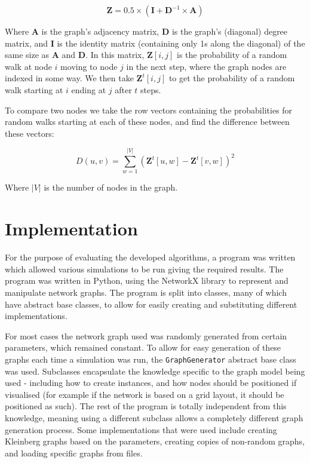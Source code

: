 \documentclass[bsc,frontabs,twoside,singlespacing,parskip,deptreport]{infthesis}     %
\begin{document}
\begin{equation}
\textbf{Z} = 0.5 \times (\textbf{I} + \textbf{D}^{-1} \times \textbf{A})
\end{equation}

Where $\textbf{A}$ is the graph's adjacency matrix, $\textbf{D}$ is the graph's (diagonal) degree matrix, and $\textbf{I}$ is the identity matrix (containing only 1s along the diagonal) of the same size as $\textbf{A}$ and $\textbf{D}$. In this matrix, $\textbf{Z}[i, j]$ is the probability of a random walk at node $i$ moving to node $j$ in the next step, where the graph nodes are indexed in some way. We then take $\textbf{Z}^{t}[i, j]$ to get the probability of a random walk starting at $i$ ending at $j$ after $t$ steps.

To compare two nodes we take the row vectors containing the probabilities for random walks starting at each of these nodes, and find the difference between these vectors:

\begin{equation}
D(u, v) = \sum_{w=1}^{|V|} (\textbf{Z}^{t}[u, w] - \textbf{Z}^{t}[v, w])^{2}
\end{equation}

Where $|V|$ is the number of nodes in the graph.

\chapter{Implementation} \label{chapter3}
For the purpose of evaluating the developed algorithms, a program was written which allowed various simulations to be run giving the required results. The program was written in Python, using the NetworkX library\cite{NetworkX} to represent and manipulate network graphs. The program is split into classes, many of which have abstract base classes, to allow for easily creating and substituting different implementations.

For most cases the network graph used was randomly generated from certain parameters, which remained constant. To allow for easy generation of these graphs each time a simulation was run, the \texttt{GraphGenerator} abstract base class was used. Subclasses encapsulate the knowledge specific to the graph model being used - including how to create instances, and how nodes should be positioned if visualised (for example if the network is based on a grid layout, it should be positioned as such). The rest of the program is totally independent from this knowledge, meaning using a different subclass allows a completely different graph generation process. Some implementations that were used include creating Kleinberg graphs based on the parameters, creating copies of non-random graphs, and loading specific graphs from files.
\end{document}
